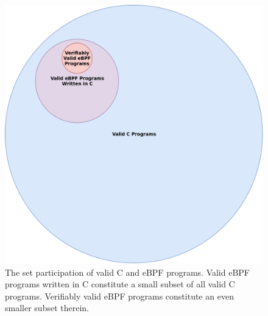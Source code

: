 \documentclass[
  12pt]{findlay}
\begin{document}
\begin{figure}
\begin{center}
\includegraphics{../figures/valid-ebpf.png}
\end{center}
\caption[The set participation of valid C and eBPF programs.]
{
The set participation of valid C and eBPF programs.
Valid eBPF programs written in C constitute a small subset of all valid C programs. Verifiably valid eBPF programs
constitute an even smaller subset therein.
}
\label{valid-ebpf}
\end{figure}
\end{document}
